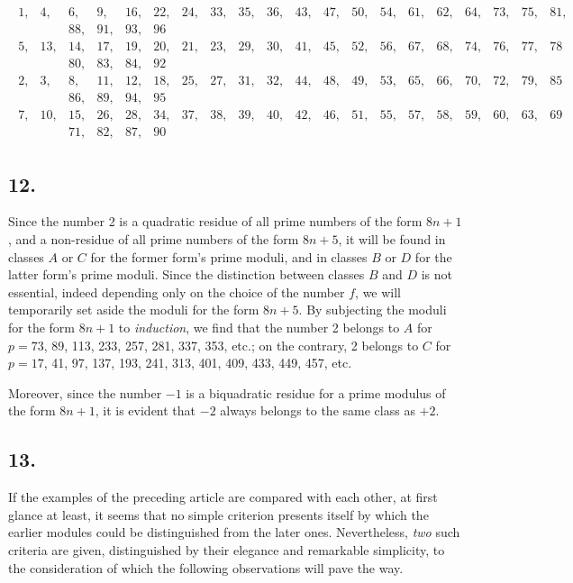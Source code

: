 \documentclass[twoside,12pt, showframe]{memoir}
\begin{document}
\[\begin{aligned}
\begin{array}{|rrrrrrrrrrrrrrrrrrrrrr}
1,&4,&6,&9,&16,&22,&24,&33,&35,&36,&43,&47,&50,&54,&61,&62,&64,&73,&75,&81,\\
&&88,&91,&93,&96 \\ 
5,&13,&14,& 17,&19,&20,&21,&23,&29,&30,&41,&45,&52,&56,&67,&68,&74,&76,&77,&78 \\ 
&&80,&83,&84,&92 \\
2,& 3,& 8,&11,&12,&18,&25,&27,&31,&32,&44,&48,&49,&53,&65,&66,&70,&72,&79,&85 \\ 
&&86,&89,&94,&95\\
7,&10,&15,&26,&28,&34,& 37,&38,&39,&40,&42,&46,&51,&55,&57,&58,&59,&60,&63,&69 \\
&&71,&82,&87,&90
\end{array} 
\end{aligned}\]
%

\subsection*{12.}
 
Since the number 2 is a quadratic residue of all prime numbers of the form \(8n+1\), and a non-residue of all prime numbers of the form \(8n+5\), it will be found in classes \(A\) or \(C\) for the former form's prime moduli, and in classes \(B\) or \(D\) for the latter form's prime moduli. Since the distinction between classes \(B\) and \(D\) is not essential, indeed depending only on the choice of the number \(f\), we will temporarily set aside the moduli for the form \(8n+5\). By subjecting the moduli for the form \(8n+1\) to \textit{induction}, we find that the number 2 belongs to \(A\) for \(p=73\), 89, 113, 233, 257, 281, 337, 353, etc.; on the contrary, 2 belongs to \(C\) for \(p=17\), 41, 97, 137, 193, 241, 313, 401, 409, 433, 449, 457, etc.
 
Moreover, since the number \(-1\) is a biquadratic residue for a prime modulus of the form \(8n+1\), it is evident that \(-2\) always belongs to the same class as \(+2\).
%

\subsection*{13.}

If the examples of the preceding article are compared with each other, at first glance at least, it seems that no simple criterion presents itself by which the earlier modules could be distinguished from the later ones. Nevertheless, \textit{two} such criteria are given, distinguished by their elegance and remarkable simplicity, to the consideration of which the following observations will pave the way.
%
\end{document}
